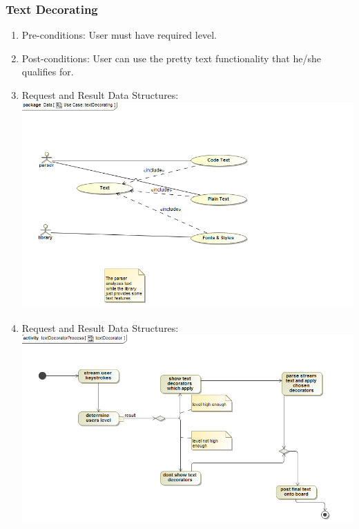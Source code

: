 \documentclass[hidelinks, 12pt, oneside]{article}
\begin{document}
\subsubsection{Text Decorating}
\begin{enumerate}
 \item Pre-conditions: User must have required level.
 \\
 
\item Post-conditions: User can use the pretty text functionality that he/she qualifies for. 
\\  
  
 \item Request and Result Data Structures:\\
  \includegraphics[scale=0.4]{textDecorator}\\
 \item Request and Result Data Structures:\\
  \includegraphics[scale=0.4]{textDecoratorProcess}\\


\end{enumerate}
\end{document}
